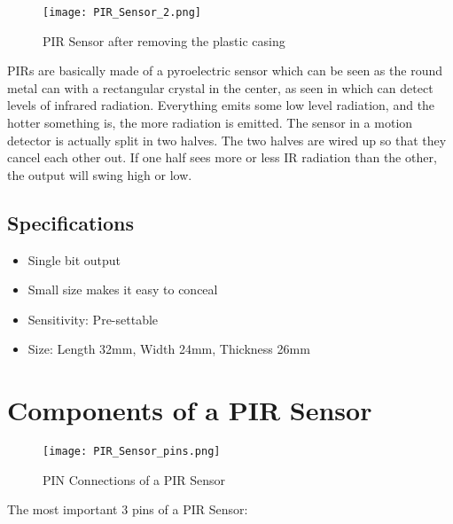 \documentclass[a4paper,12 pt]{article}
\begin{document}
\begin{figure}[h]
\begin{center}
\texttt{[image: PIR\_Sensor\_2.png]}
\caption{PIR Sensor after removing the plastic casing}
\label{fig:2}
\end{center}
\end{figure}

PIRs are basically made of a pyroelectric sensor which can be seen as the round metal can with a rectangular crystal in the center, as seen in  which can detect levels of infrared radiation. Everything emits some low level radiation, and the hotter something is, the more radiation is emitted. The sensor in a motion detector is actually split in two halves.  The two halves are wired up so that they cancel each other out. If one half sees more or less IR radiation than the other, the output will swing high or low. 

\subsection{Specifications}
\begin{itemize}
\item Single bit output
\item Small size makes it easy to conceal
\item Sensitivity: Pre-settable
\item Size: Length 32mm, Width 24mm, Thickness 26mm

\end{itemize}

\section{Components of a PIR Sensor}
\vspace {5 mm}
\begin{figure}[h]
\begin{center}
\texttt{[image: PIR\_Sensor\_pins.png]}
\caption{PIN Connections of a PIR Sensor}
\label{fig:3}
\end{center}
\end{figure}


\large The most important 3 pins of a PIR Sensor:
\end{document}
